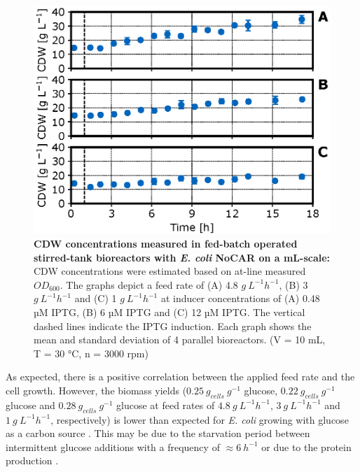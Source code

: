 \documentclass[sn-standardnature]{sn-jnl}%
\theoremstyle{thmstyleone}%
\theoremstyle{thmstyletwo}%
\theoremstyle{thmstylethree}%
\begin{document}
\begin{figure}[H]
    \centering
    \includegraphics[width=1.0\textwidth]{figures/Fig2.eps}
    \caption{
        \textbf{CDW concentrations measured in fed-batch operated stirred-tank bioreactors with \textit{E. coli} NoCAR on a mL-scale:}
        CDW concentrations were estimated based on at-line measured $OD_{600}$.
        The graphs depict a feed rate of (A) 4.8 $ g\ L^{-1} h^{-1}$, (B) 3 $ g\ L^{-1} h^{-1}$ and (C) 1 $ g\ L^{-1} h^{-1}$ at inducer concentrations of (A) 0.48 µM IPTG, (B) 6 µM IPTG and (C) 12 µM IPTG.
        The vertical dashed lines indicate the IPTG induction.
        Each graph shows the mean and standard deviation of 4 parallel bioreactors.
        (V = 10 mL, T = 30 °C, n = 3000 rpm)
    }
    \label{fig_btmoverview}
\end{figure}

As expected, there is a positive correlation between the applied feed rate and the cell growth.
However, the biomass yields ($0.25\ g_{cells}\ g^{-1}$ glucose, $0.22\ g_{cells}\ g^{-1}$ glucose and $0.28\ g_{cells}\ g^{-1}$ glucose at feed rates of $4.8\ g\ L^{-1} h^{-1}$, $3\ g\ L^{-1} h^{-1}$ and $1\ g\ L^{-1} h^{-1}$, respectively) is lower than expected for \textit{E. coli} growing with glucose as a carbon source \cite{schmideder2015novel}.
This may be due to the starvation period between intermittent glucose additions with a frequency of $\approx 6\ h^{-1}$ or due to the protein production \cite{faust2014feeding}.
\end{document}
